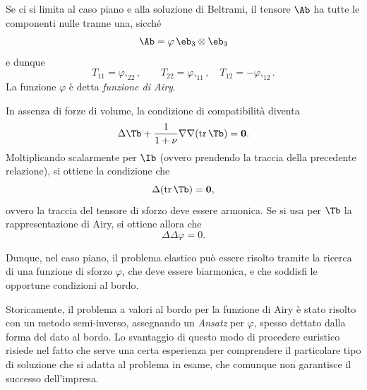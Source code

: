 Se ci si limita al caso piano e alla soluzione di Beltrami, il tensore $\Ab$ ha tutte le componenti nulle tranne una, sicché
\begin{equation}
	\Ab=\varphi\,\eb_3\otimes\eb_3
\end{equation}
e dunque
\begin{equation}\label{Airy}
T_{11}=\varphi,_{22}, \qquad T_{22}=\varphi,_{11}, \quad T_{12}=-\varphi,_{12}.
\end{equation}
La funzione $\varphi$ è detta \textit{funzione di Airy}.

In assenza di forze di volume, la condizione di compatibilità diventa 
\begin{equation}
\Delta \Tb +\frac{1}{1+\nu}\nabla \nabla (\operatorname{tr}\Tb)=\mathbf{0}.
\end{equation}
Moltiplicando scalarmente per $\Ib$ (ovvero prendendo la traccia della precedente relazione), si ottiene la condizione che
\begin{equation}\label{trharm}
\Delta (\operatorname{tr}\Tb)=\mathbf{0},
\end{equation}
ovvero la traccia del tensore di sforzo deve essere armonica. Se si usa per $\Tb$ la rappresentazione di Airy, si ottiene allora che
\begin{equation}\label{biharmonic} 
\Delta \Delta \varphi=0.
\end{equation}

Dunque, nel caso piano, il problema elastico può essere risolto tramite la ricerca di una funzione di sforzo $\varphi$, che deve essere biarmonica, e che soddisfi le opportune condizioni al bordo.


Storicamente, il problema a valori al bordo per la funzione di Airy è stato risolto con un metodo semi-inverso, assegnando un \textit{Ansatz} per $\varphi$, spesso dettato dalla forma del dato al bordo. Lo svantaggio di questo modo di procedere euristico risiede nel fatto che serve una certa esperienza per comprendere il particolare tipo di soluzione che si adatta al problema in esame, che comunque non garantisce il successo dell'impresa. 



